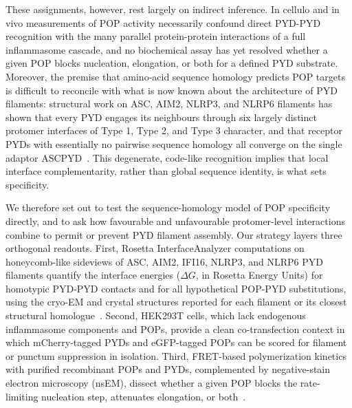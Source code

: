 These assignments, however, rest largely on indirect inference. In cellulo and in vivo measurements of POP activity necessarily confound direct PYD-PYD recognition with the many parallel protein-protein interactions of a full inflammasome cascade, and no biochemical assay has yet resolved whether a given POP blocks nucleation, elongation, or both for a defined PYD substrate. Moreover, the premise that amino-acid sequence homology predicts POP targets is difficult to reconcile with what is now known about the architecture of PYD filaments: structural work on ASC, AIM2, NLRP3, and NLRP6 filaments has shown that every PYD engages its neighbours through six largely distinct protomer interfaces of Type 1, Type 2, and Type 3 character, and that receptor PYDs with essentially no pairwise sequence homology all converge on the single adaptor ASCPYD~\cite{lu2014unified,shen2019nlrp6,hochheiser2022directionality,matyszewski2021distinct,morrone2015assembly,sharif2019nek7,andreeva2021nlrp3}. This degenerate, code-like recognition implies that local interface complementarity, rather than global sequence identity, is what sets specificity.

We therefore set out to test the sequence-homology model of POP specificity directly, and to ask how favourable and unfavourable protomer-level interactions combine to permit or prevent PYD filament assembly. Our strategy layers three orthogonal readouts. First, Rosetta InterfaceAnalyzer computations on honeycomb-like sideviews of ASC, AIM2, IFI16, NLRP3, and NLRP6 PYD filaments quantify the interface energies ($\Delta G$, in Rosetta Energy Units) for homotypic PYD-PYD contacts and for all hypothetical POP-PYD substitutions, using the cryo-EM and crystal structures reported for each filament or its closest structural homologue~\cite{lu2014unified,shen2019nlrp6,hochheiser2022directionality,sharif2019nek7,matyszewski2021distinct}. Second, HEK293T cells, which lack endogenous inflammasome components and POPs, provide a clean co-transfection context in which mCherry-tagged PYDs and eGFP-tagged POPs can be scored for filament or punctum suppression in isolation. Third, FRET-based polymerization kinetics with purified recombinant POPs and PYDs, complemented by negative-stain electron microscopy (nsEM), dissect whether a given POP blocks the rate-limiting nucleation step, attenuates elongation, or both~\cite{mazanek2019fret,matyszewski2018digital,morrone2015assembly}.

